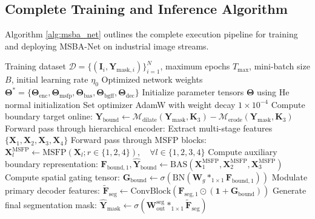 \documentclass{ieeeaccess}
\begin{document}
\subsection{Complete Training and Inference Algorithm}
Algorithm \ref{alg:msba_net} outlines the complete execution pipeline for training and deploying MSBA-Net on industrial image streams.

\begin{algorithm}[!t]
\caption{MSBA-Net End-to-End Training and Boundary-Guided Inference Pipeline}
\label{alg:msba_net}
\begin{algorithmic}[1]
\REQUIRE Training dataset $\mathcal{D} = \{(\mathbf{I}_i, \mathbf{Y}_{\text{mask}, i})\}_{i=1}^N$, maximum epochs $T_{\text{max}}$, mini-batch size $B$, initial learning rate $\eta_0$
\ENSURE Optimized network weights $\boldsymbol{\Theta}^* = \{\boldsymbol{\Theta}_{\text{enc}}, \boldsymbol{\Theta}_{\text{msfp}}, \boldsymbol{\Theta}_{\text{bas}}, \boldsymbol{\Theta}_{\text{bgff}}, \boldsymbol{\Theta}_{\text{dec}}\}$
\STATE Initialize parameter tensors $\boldsymbol{\Theta}$ using He normal initialization
\STATE Set optimizer AdamW with weight decay $1 \times 10^{-4}$
    \STATE Compute boundary target online:
    \STATE \quad $\mathbf{Y}_{\text{bound}} \leftarrow \mathcal{M}_{\text{dilate}}(\mathbf{Y}_{\text{mask}}, \mathbf{K}_3) - \mathcal{M}_{\text{erode}}(\mathbf{Y}_{\text{mask}}, \mathbf{K}_3)$
    \STATE Forward pass through hierarchical encoder:
    \STATE \quad Extract multi-stage features $\{\mathbf{X}_1, \mathbf{X}_2, \mathbf{X}_3, \mathbf{X}_4\}$
    \STATE Forward pass through MSFP blocks:
    \STATE \quad $\mathbf{X}_l^{\text{MSFP}} \leftarrow \text{MSFP}(\mathbf{X}_l; r \in \{1, 2, 4\}), \quad \forall l \in \{1, 2, 3, 4\}$
    \STATE Compute auxiliary boundary representation:
    \STATE \quad $\mathbf{F}_{\text{bound}, 1}, \hat{\mathbf{Y}}_{\text{bound}} \leftarrow \text{BAS}(\mathbf{X}_1^{\text{MSFP}}, \mathbf{X}_2^{\text{MSFP}}, \mathbf{X}_3^{\text{MSFP}})$
    \STATE Compute spatial gating tensor:
    \STATE \quad $\mathbf{G}_{\text{bound}} \leftarrow \sigma\left(\text{BN}\left(\mathbf{W}_g *_{1\times 1} \mathbf{F}_{\text{bound}, 1}\right)\right)$
    \STATE Modulate primary decoder features:
    \STATE \quad $\tilde{\mathbf{F}}_{\text{seg}} \leftarrow \text{ConvBlock}\left(\mathbf{F}_{\text{seg}, 1} \odot (\mathbf{1} + \mathbf{G}_{\text{bound}})\right)$
    \STATE Generate final segmentation mask:
    \STATE \quad $\hat{\mathbf{Y}}_{\text{mask}} \leftarrow \sigma\left(\mathbf{W}_{\text{out}}^{\text{seg}} *_{1\times 1} \tilde{\mathbf{F}}_{\text{seg}}\right)$

\end{algorithmic}
\end{algorithm}
\end{document}
